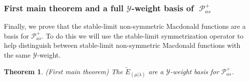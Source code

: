 \documentclass[11pt]{article}
\newtheorem{thm}[theo]{Theorem}
\theoremstyle{definition}
\numberwithin{equation}{section}
\newcommand{\y}{{ \mathscr{Y} }}
\DeclareMathOperator{\sP}{\mathscr{P} }
\begin{document}
\subsubsection{First main theorem and a full $\y$-weight basis of $\sP_{as}^{+}$}

Finally, we prove that the stable-limit non-symmetric Macdonald functions are a basis for $\mathscr{P}_{as}^{+}$. To do this we will use the stable-limit symmetrization operator to help distinguish between stable-limit non-symmetric Macdonald functions with the same $\y$-weight. 

\begin{thm}(First main theorem) \label{main theorem}
The $\widetilde{E}_{(\mu|\lambda)}$ are a $\y$-weight basis for $\mathscr{P}_{as}^{+}$.
\end{thm}
\end{document}
